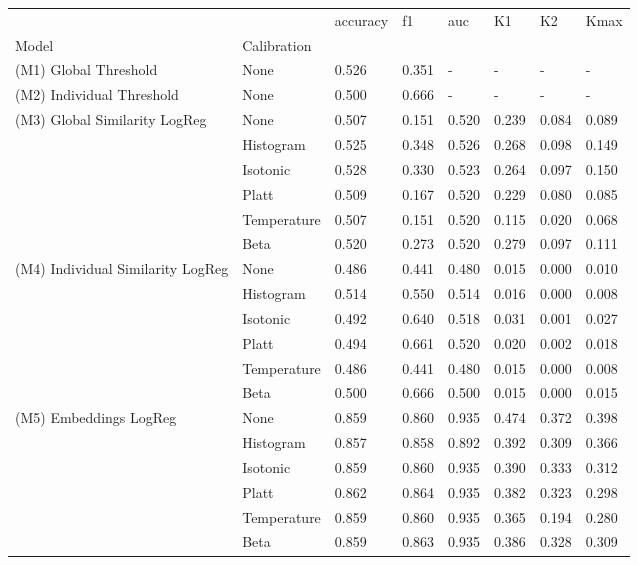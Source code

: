 \begin{tabular}{llllllll}
\toprule
 &  & accuracy & f1 & auc & K1 & K2 & Kmax \\
Model & Calibration &  &  &  &  &  &  \\
\midrule
(M1) Global Threshold & None & 0.526 & 0.351 & - & - & - & - \\
\cline{1-8}
(M2) Individual Threshold & None & 0.500 & 0.666 & - & - & - & - \\
\cline{1-8}
\multirow[t]{6}{*}{(M3) Global Similarity LogReg} & None & 0.507 & 0.151 & 0.520 & 0.239 & 0.084 & 0.089 \\
 & Histogram & 0.525 & 0.348 & 0.526 & 0.268 & 0.098 & 0.149 \\
 & Isotonic & 0.528 & 0.330 & 0.523 & 0.264 & 0.097 & 0.150 \\
 & Platt & 0.509 & 0.167 & 0.520 & 0.229 & 0.080 & 0.085 \\
 & Temperature & 0.507 & 0.151 & 0.520 & 0.115 & 0.020 & 0.068 \\
 & Beta & 0.520 & 0.273 & 0.520 & 0.279 & 0.097 & 0.111 \\
\cline{1-8}
\multirow[t]{6}{*}{(M4) Individual Similarity LogReg} & None & 0.486 & 0.441 & 0.480 & 0.015 & 0.000 & 0.010 \\
 & Histogram & 0.514 & 0.550 & 0.514 & 0.016 & 0.000 & 0.008 \\
 & Isotonic & 0.492 & 0.640 & 0.518 & 0.031 & 0.001 & 0.027 \\
 & Platt & 0.494 & 0.661 & 0.520 & 0.020 & 0.002 & 0.018 \\
 & Temperature & 0.486 & 0.441 & 0.480 & 0.015 & 0.000 & 0.008 \\
 & Beta & 0.500 & 0.666 & 0.500 & 0.015 & 0.000 & 0.015 \\
\cline{1-8}
\multirow[t]{6}{*}{(M5) Embeddings LogReg} & None & 0.859 & 0.860 & 0.935 & 0.474 & 0.372 & 0.398 \\
 & Histogram & 0.857 & 0.858 & 0.892 & 0.392 & 0.309 & 0.366 \\
 & Isotonic & 0.859 & 0.860 & 0.935 & 0.390 & 0.333 & 0.312 \\
 & Platt & 0.862 & 0.864 & 0.935 & 0.382 & 0.323 & 0.298 \\
 & Temperature & 0.859 & 0.860 & 0.935 & 0.365 & 0.194 & 0.280 \\
 & Beta & 0.859 & 0.863 & 0.935 & 0.386 & 0.328 & 0.309 \\
\cline{1-8}
\bottomrule
\end{tabular}
